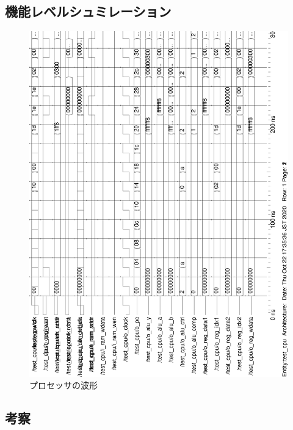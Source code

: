 \subsection{機能レベルシュミレーション}
\begin{figure}[H]
  \centering
  \includegraphics[width=\linewidth]{./src/01/mips_de10-lite/MIPS/testCPUwave.ps}
  \caption{プロセッサの波形}
\end{figure}

\subsection{考察}
